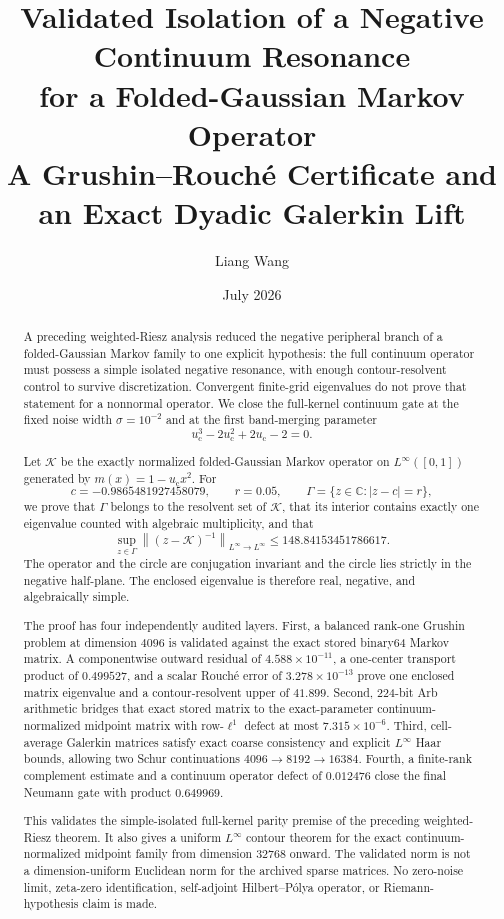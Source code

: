 \documentclass[11pt]{article}
\title{Validated Isolation of a Negative Continuum Resonance\\
for a Folded-Gaussian Markov Operator\\
\large A Grushin--Rouch\'e Certificate and an Exact Dyadic Galerkin Lift}
\author{Liang Wang}
\date{July 2026}
\theoremstyle{definition}
\theoremstyle{remark}
\newcommand{\C}{\mathbb C}
\newcommand{\cK}{\mathcal K}
\newcommand{\uc}{u_{\mathrm c}}
\newcommand{\norm}[1]{\left\lVert #1\right\rVert}
\begin{document}
\maketitle

\begin{abstract}
A preceding weighted-Riesz analysis reduced the negative peripheral branch
of a folded-Gaussian Markov family to one explicit hypothesis: the full
continuum operator must possess a simple isolated negative resonance, with
enough contour-resolvent control to survive discretization.  Convergent
finite-grid eigenvalues do not prove that statement for a nonnormal
operator.  We close the full-kernel continuum gate at the fixed noise width
$\sigma=10^{-2}$ and at the first band-merging parameter
\[
 \uc^3-2\uc^2+2\uc-2=0.
\]

Let $\cK$ be the exactly normalized folded-Gaussian Markov operator on
$L^\infty([0,1])$ generated by $m(x)=1-\uc x^2$.  For
\[
 c=-0.9865481927458079,\qquad r=0.05,\qquad
 \Gamma=\{z\in\C:|z-c|=r\},
\]
we prove that $\Gamma$ belongs to the resolvent set of $\cK$, that its
interior contains exactly one eigenvalue counted with algebraic
multiplicity, and that
\[
 \sup_{z\in\Gamma}\norm{(z-\cK)^{-1}}_{L^\infty\to L^\infty}
 \le 148.84153451786617.
\]
The operator and the circle are conjugation invariant and the circle lies
strictly in the negative half-plane.  The enclosed eigenvalue is therefore
real, negative, and algebraically simple.

The proof has four independently audited layers.  First, a balanced
rank-one Grushin problem at dimension $4096$ is validated against the exact
stored binary64 Markov matrix.  A componentwise outward residual of
$4.588\times10^{-11}$, a one-center transport product of $0.499527$, and a
scalar Rouch\'e error of $3.278\times10^{-13}$ prove one enclosed matrix
eigenvalue and a contour-resolvent upper of $41.899$.  Second, 224-bit Arb
arithmetic bridges that exact stored matrix to the exact-parameter
continuum-normalized midpoint matrix with row-$\ell^1$ defect at most
$7.315\times10^{-6}$.  Third, cell-average Galerkin matrices satisfy exact
coarse consistency and explicit $L^\infty$ Haar bounds, allowing two Schur
continuations $4096\to8192\to16384$.  Fourth, a finite-rank complement
estimate and a continuum operator defect of $0.012476$ close the final
Neumann gate with product $0.649969$.

This validates the simple-isolated full-kernel parity premise of the
preceding weighted-Riesz theorem.  It also gives a uniform
$L^\infty$ contour theorem for the exact continuum-normalized midpoint
family from dimension $32768$ onward.  The validated norm is not a
dimension-uniform Euclidean norm for the archived sparse matrices.  No
zero-noise limit, zeta-zero identification, self-adjoint
Hilbert--P\'olya operator, or Riemann-hypothesis claim is made.
\end{abstract}
\end{document}
